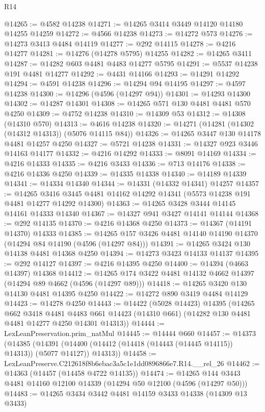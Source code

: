 \begin{lexlean}{R14}
\begin{coremodule}
@14265 := @4582 @14238
@14271 := @14265 @3414 @3449 @14120 @14180 @14255 @14259
@14272 := @4566 @14238
@14273 := @14272 @573
@14276 := @14273 @3413 @4484 @14119
@14277 := @292 @14115
@14278 := @4216 @14277
@14281 := @14276 (@14278 @5795) @14255
@14282 := @14265 @3411
@14287 := @14282 @603 @4481 @4483 @14277 @5795
@14291 := @5537 @14238 @191 @4481 @14277
@14292 := @4431 @14166
@14293 := @14291 @14292
@14294 := @4591 @14238
@14296 := @14294 @94 @14195
@14297 := @4597 @14238
@14300 := @14296 (@4596 (@14297 @94))
@14301 := @14293 @14300
@14302 := @14287 @14301
@14308 := @14265 @571 @130 @4481 @4481 @570 @4250
@14309 := @4752 @14238
@14310 := @14309 @53
@14312 := @14308 (@14310 @570)
@14313 := @4616 @14238
@14320 := @14271 (@14281 (@14302 (@14312 @14313)) (@5076 @14115 @84))
@14326 := @14265 @3447 @130 @14178 @4481 @14257 @4250
@14327 := @5721 @14238
@14331 := @14327 @923 @3446 @14163 @14177
@14332 := @4216 @14292
@14333 := @8091 @14169
@14334 := @4216 @14333
@14335 := @4216 @3433
@14336 := @713 @14176
@14338 := @4216 @14336 @4250
@14339 := @14335 @14338
@14340 := @14189 @14339
@14341 := @14334 @14340
@14344 := @14331 (@14332 @14341) @14257
@14357 := @14265
    @3416
    @3445
    @4481
    @14162
    @14292
    @14341
    (@5573 @14238 @191 @4481 @14277 @14292 @14300)
@14363 := @14265 @3428 @3444 @14145 @14161 @14333 @14340
@14367 := @14327 @941 @3427 @14141 @14144
@14368 := @292 @14135
@14370 := @4216 @14368 @4250
@14373 := @14367 (@14191 @14370) @14333
@14385 := @14265 @157 @3426 @4481 @14140 @14190 @14370 (@14294 @84 @14190 (@4596 (@14297 @84)))
@14391 := @14265 @3424 @130 @14138 @4481 @14368 @4250
@14394 := @14273 @3423 @14133 @14137
@14395 := @292 @14127
@14397 := @4216 @14395 @4250
@14400 := @14394 (@4663 @14397) @14368
@14412 := @14265 @174 @3422 @4481 @14132 @4662 @14397 (@14294 @89 @4662 (@4596 (@14297 @89)))
@14418 := @14265 @3420 @130 @14130 @4481 @14395 @4250
@14422 := @14272 @890 @3419 @4484 @14129
@14423 := @14278 @4250
@14443 := @14422
    (@5028 @14423)
    @14395
    (@14265
      @662
      @3418
      @4481
      @4483
      @661
      @14423
      (@14310 @661)
      (@14282 @130 @4481 @4481 @14277 @4250 @14301 @14313))
@14444 := LexLeanPreservation.prim_natMul
@14445 := @14444 @660
@14457 := @14373
    (@14385
      (@14391 (@14400 (@14412 (@14418 (@14443 (@14445 @14115)) @14313)) (@5077 @14127)) @14313))
@14458 := LexLeanPreserve.C212618f8b6ebac3a5c1e1dd0896866e7.R14.__rel_26
@14462 := @14363 (@14457 (@14458 @4722 @14135))
@14474 := @14265 @144 @3443 @4481 @14160 @12100 @14339 (@14294 @50 @12100 (@4596 (@14297 @50)))
@14483 := @14265 @3434 @3442 @4481 @14159 @3433 @14338 (@14309 @13 @3433)

\end{coremodule}
\end{lexlean}
